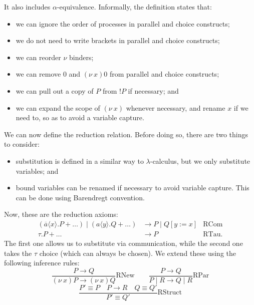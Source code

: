 \documentclass[a4paper, openany]{memoir}
\theoremstyle{definition}
\begin{document}
    It also includes $\alpha$-equivalence. Informally, the definition states that:
    \begin{itemize}
        \item we can ignore the order of processes in parallel and choice constructs;
        \item we do not need to write brackets in parallel and choice constructs;
        \item we can reorder $\nu$ binders;
        \item we can remove $0$ and $(\nu \  x) 0$ from parallel and choice constructs;
        \item we can pull out a copy of $P$ from $!P$ if necessary; and
        \item we can expand the scope of $(\nu \ x)$ whenever necessary, and rename $x$ if we need to, so as to avoid a variable capture.
    \end{itemize}

    We can now define the reduction relation. Before doing so, there are two things to consider:
    \begin{itemize}
        \item substitution is defined in a similar way to $\lambda$-calculus, but we only substitute variables; and
        \item bound variables can be renamed if necessary to avoid variable capture. This can be done using Barendregt convention.
    \end{itemize}
    Now, these are the reduction axioms:
    \begin{align*}
        (\overline{a} \langle x \rangle.P + \dots) \mid (a \langle y \rangle.Q + \dots) &\to P \mid Q[ y:= x] & \textrm{RCom} \\
        \tau.P + \dots &\to P & \textrm{RTau}.
    \end{align*}
    The first one allows us to substitute via communication, while the second one takes the $\tau$ choice (which can always be chosen). We extend these using the following inference rules:
    \[\frac{P \to Q}{(\nu \ x)P \to (\nu \ x)Q} \textrm{RNew} \qquad \frac{P \to Q}{P \mid R \to Q \mid R} \textrm{RPar}\]
    \[\frac{P' \equiv P \quad P \to R \quad Q \equiv Q'}{P' \equiv Q'} \textrm{RStruct}\]
\end{document}
